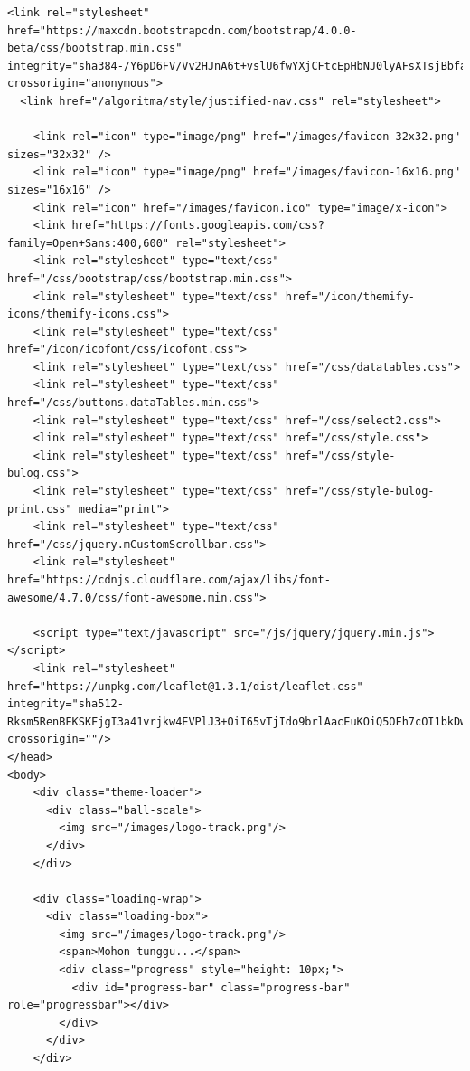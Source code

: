 \begin{enumerate}
\begin{lstlisting}[caption=Pemanggilan Library setView pada index.php]
  <link rel="stylesheet" href="https://maxcdn.bootstrapcdn.com/bootstrap/4.0.0-beta/css/bootstrap.min.css" integrity="sha384-/Y6pD6FV/Vv2HJnA6t+vslU6fwYXjCFtcEpHbNJ0lyAFsXTsjBbfaDjzALeQsN6M" crossorigin="anonymous">
  <link href="/algoritma/style/justified-nav.css" rel="stylesheet">
  
    <link rel="icon" type="image/png" href="/images/favicon-32x32.png" sizes="32x32" />
    <link rel="icon" type="image/png" href="/images/favicon-16x16.png" sizes="16x16" />
    <link rel="icon" href="/images/favicon.ico" type="image/x-icon">
    <link href="https://fonts.googleapis.com/css?family=Open+Sans:400,600" rel="stylesheet">
    <link rel="stylesheet" type="text/css" href="/css/bootstrap/css/bootstrap.min.css">
    <link rel="stylesheet" type="text/css" href="/icon/themify-icons/themify-icons.css">
    <link rel="stylesheet" type="text/css" href="/icon/icofont/css/icofont.css">
    <link rel="stylesheet" type="text/css" href="/css/datatables.css">
    <link rel="stylesheet" type="text/css" href="/css/buttons.dataTables.min.css">
    <link rel="stylesheet" type="text/css" href="/css/select2.css">
    <link rel="stylesheet" type="text/css" href="/css/style.css">
    <link rel="stylesheet" type="text/css" href="/css/style-bulog.css">
    <link rel="stylesheet" type="text/css" href="/css/style-bulog-print.css" media="print">
    <link rel="stylesheet" type="text/css" href="/css/jquery.mCustomScrollbar.css">
    <link rel="stylesheet" href="https://cdnjs.cloudflare.com/ajax/libs/font-awesome/4.7.0/css/font-awesome.min.css">

    <script type="text/javascript" src="/js/jquery/jquery.min.js"></script>
    <link rel="stylesheet" href="https://unpkg.com/leaflet@1.3.1/dist/leaflet.css" integrity="sha512-Rksm5RenBEKSKFjgI3a41vrjkw4EVPlJ3+OiI65vTjIdo9brlAacEuKOiQ5OFh7cOI1bkDwLqdLw3Zg0cRJAAQ==" crossorigin=""/>
</head>
<body>
    <div class="theme-loader">
      <div class="ball-scale">
        <img src="/images/logo-track.png"/>
      </div>
    </div>

    <div class="loading-wrap">
      <div class="loading-box">
        <img src="/images/logo-track.png"/>
        <span>Mohon tunggu...</span>
        <div class="progress" style="height: 10px;">
          <div id="progress-bar" class="progress-bar" role="progressbar"></div>
        </div>
      </div>
    </div>


\end{lstlisting}
\end{enumerate}
